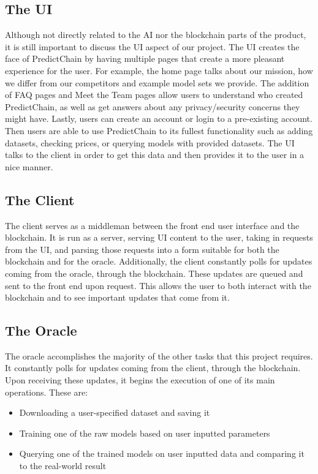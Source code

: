 \documentclass{article}
\begin{document}
\subsection{The UI}
Although not directly related to the AI nor the blockchain parts of the product, it is still important to discuss the UI aspect of our project. The UI creates the face of PredictChain by having multiple pages that create a more pleasant experience for the user. For example, the home page talks about our mission, how we differ from our competitors and example model sets we provide. The addition of FAQ pages and Meet the Team pages allow users to understand who created PredictChain, as well as get answers about any privacy/security concerns they might have. Lastly, users can create an account or login to a pre-existing account. Then users are able to use PredictChain to its fullest functionality such as adding datasets, checking prices, or querying models with provided datasets. The UI talks to the client in order to get this data and then provides it to the user in a nice manner.

\subsection{The Client}

The client serves as a middleman between the front end user interface and the
blockchain.  It is run as a server, serving UI content to the user, taking in requests from the UI, and parsing those
requests into a form suitable for both the blockchain and for the oracle.  Additionally, the client constantly polls
for updates coming from the oracle, through the blockchain.  These updates are queued and sent to the front end upon request.
This allows the user to both interact with the blockchain and to see important updates that come from it.

\subsection{The Oracle}

The oracle accomplishes the majority of the other tasks that this project requires.  It constantly polls for updates
coming from the client, through the blockchain.  Upon receiving these updates, it begins the execution of one of its
main operations.  These are:

\begin{itemize}
    \item Downloading a user-specified dataset and saving it
    \item Training one of the raw models based on user inputted parameters
    \item Querying one of the trained models on user inputted data and comparing it to the real-world result
\end{itemize}
\end{document}
